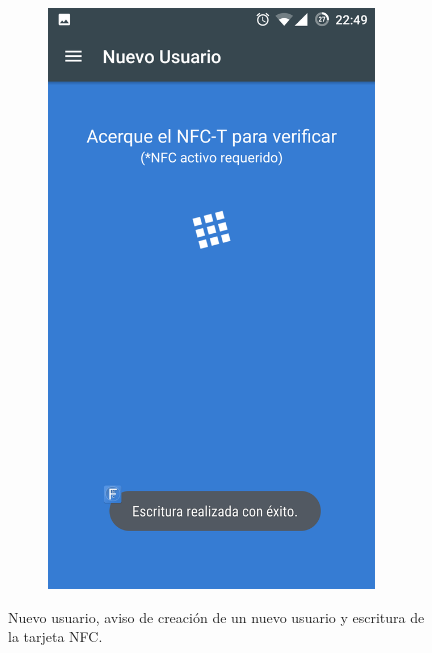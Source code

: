 \documentclass[../PFC.tex]{subfiles}
\begin{document}
\begin{figure}[H]
\begin{subfigure}{0.32\textwidth}
       \includegraphics[width=0.95\textwidth]{./img/app/nuevoUsuarioAgregado}
    \end{subfigure}   
  \caption{Nuevo usuario, aviso de creación de un nuevo usuario y escritura de la tarjeta NFC.}
  \label{img:app:nuevoUsuario}  
\end{figure}
\end{document}
